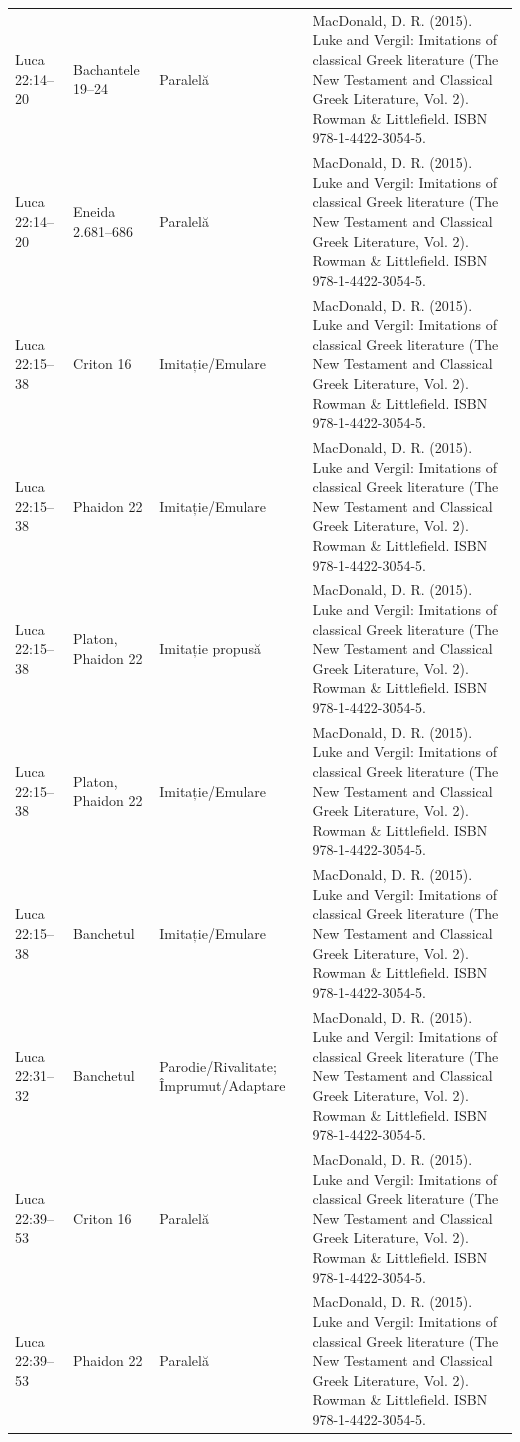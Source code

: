 \documentclass[12pt,a4paper,twoside,openany]{book}
\begin{document}
\begin{longtable}{L{1.4cm}L{1.7cm}L{3.1cm}L{8.4cm}}
Luca 22:14–20 & Bachantele 19–24 & Paralelă & MacDonald, D. R. (2015). Luke and Vergil: Imitations of classical Greek literature (The New Testament and Classical Greek Literature, Vol. 2). Rowman \& Littlefield. ISBN 978-1-4422-3054-5. \\
Luca 22:14–20 & Eneida 2.681–686 & Paralelă & MacDonald, D. R. (2015). Luke and Vergil: Imitations of classical Greek literature (The New Testament and Classical Greek Literature, Vol. 2). Rowman \& Littlefield. ISBN 978-1-4422-3054-5. \\
Luca 22:15–38 & Criton 16 & Imitație/Emulare & MacDonald, D. R. (2015). Luke and Vergil: Imitations of classical Greek literature (The New Testament and Classical Greek Literature, Vol. 2). Rowman \& Littlefield. ISBN 978-1-4422-3054-5. \\
Luca 22:15–38 & Phaidon 22 & Imitație/Emulare & MacDonald, D. R. (2015). Luke and Vergil: Imitations of classical Greek literature (The New Testament and Classical Greek Literature, Vol. 2). Rowman \& Littlefield. ISBN 978-1-4422-3054-5. \\
Luca 22:15–38 & Platon, Phaidon 22 & Imitație propusă & MacDonald, D. R. (2015). Luke and Vergil: Imitations of classical Greek literature (The New Testament and Classical Greek Literature, Vol. 2). Rowman \& Littlefield. ISBN 978-1-4422-3054-5. \\
Luca 22:15–38 & Platon, Phaidon 22 & Imitație/Emulare & MacDonald, D. R. (2015). Luke and Vergil: Imitations of classical Greek literature (The New Testament and Classical Greek Literature, Vol. 2). Rowman \& Littlefield. ISBN 978-1-4422-3054-5. \\
Luca 22:15–38 & Banchetul & Imitație/Emulare & MacDonald, D. R. (2015). Luke and Vergil: Imitations of classical Greek literature (The New Testament and Classical Greek Literature, Vol. 2). Rowman \& Littlefield. ISBN 978-1-4422-3054-5. \\
Luca 22:31–32 & Banchetul & Parodie/Rivalitate; Împrumut/Adaptare & MacDonald, D. R. (2015). Luke and Vergil: Imitations of classical Greek literature (The New Testament and Classical Greek Literature, Vol. 2). Rowman \& Littlefield. ISBN 978-1-4422-3054-5. \\
Luca 22:39–53 & Criton 16 & Paralelă & MacDonald, D. R. (2015). Luke and Vergil: Imitations of classical Greek literature (The New Testament and Classical Greek Literature, Vol. 2). Rowman \& Littlefield. ISBN 978-1-4422-3054-5. \\
Luca 22:39–53 & Phaidon 22 & Paralelă & MacDonald, D. R. (2015). Luke and Vergil: Imitations of classical Greek literature (The New Testament and Classical Greek Literature, Vol. 2). Rowman \& Littlefield. ISBN 978-1-4422-3054-5. \\

\end{longtable}
\end{document}
